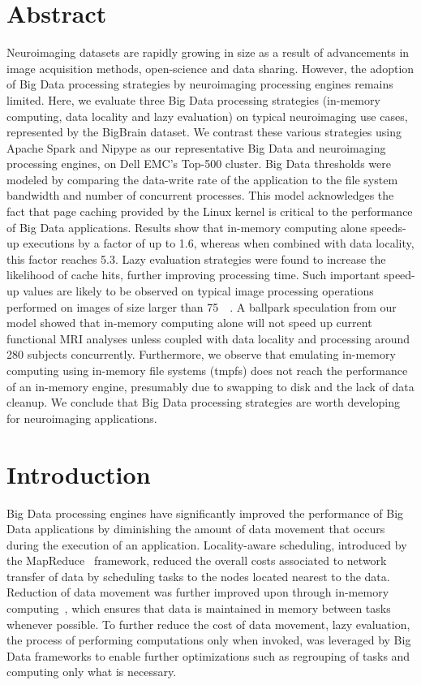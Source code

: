 \section{Abstract}
    Neuroimaging datasets are rapidly growing in size as a result of
    advancements in image acquisition methods, open-science and data sharing.
    However, the adoption of Big Data processing strategies by neuroimaging
    processing engines remains limited. Here, we evaluate three Big Data
    processing strategies (in-memory computing, data locality and lazy
    evaluation) on typical neuroimaging use cases, represented by the BigBrain
    dataset. We contrast these various strategies using Apache Spark and Nipype
    as our representative Big Data and neuroimaging processing engines, on Dell
    EMC's Top-500 cluster. Big Data thresholds were modeled by comparing the
    data-write rate of the application to the file system bandwidth and number of
    concurrent processes. This model acknowledges the fact that page caching
    provided by the Linux kernel is critical to the performance of Big Data
    applications. Results show that in-memory computing alone speeds-up
    executions by a factor of up to 1.6, whereas when combined with data
    locality, this factor reaches 5.3. Lazy evaluation strategies were found to
    increase the likelihood of cache hits, further improving processing time.
    Such important speed-up values are likely to be observed on typical image
    processing operations performed on images of size larger than \SI{75}{\giga\byte}. A
    ballpark speculation from our model showed that in-memory computing alone
    will not speed up current functional MRI analyses unless coupled with data
    locality and processing around 280 subjects concurrently. Furthermore, we
    observe that emulating in-memory computing using in-memory file systems
    (\gls{tmpfs}) does not reach the performance of an in-memory engine, presumably
    due to swapping to disk and the lack of data cleanup. We conclude that Big
    Data processing strategies are worth developing for neuroimaging
    applications. 

\section{Introduction} %

Big Data processing engines have significantly improved the performance of Big
Data applications by diminishing the amount of data movement that occurs during
the execution of an application. Locality-aware scheduling, introduced by the
MapReduce~\cite{dean2008mapreduce} framework, reduced the overall costs
associated to network transfer of data by scheduling tasks to the nodes located
nearest to the data. Reduction of data movement was further improved upon
through in-memory computing~\cite{zaharia2016apache}, which ensures that data is
maintained in memory between tasks whenever possible. To further reduce the cost
of data movement, lazy evaluation, the process of performing computations only
when invoked, was leveraged by Big Data frameworks to enable further
optimizations such as regrouping of tasks and computing only what is necessary.

